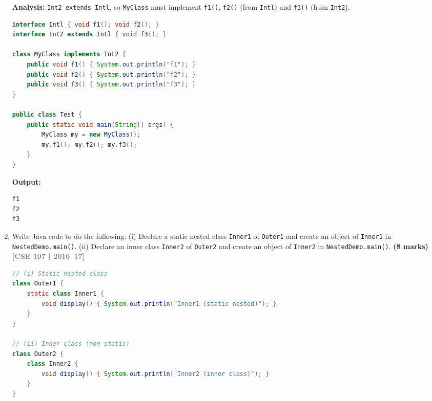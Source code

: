 \documentclass[12pt,a3paper]{article}
\newcommand{\yr}[1]{\hfill\textcolor{gray}{\small\textbf{[#1]}}}
\newcommand{\mk}[1]{\textcolor{orange!70!black}{\small\textbf{(#1 marks)}}}
\begin{document}
\begin{enumerate}
\begin{tcolorbox}[enhanced,breakable,ansbox,
  colback=cD!4,colframe=cD,boxrule=0.8pt,arc=5pt,
  title={\textbf{Answer --- Minimum Code for \texttt{MyClass}}},
  fonttitle=\bfseries\color{white},colbacktitle=cD]

\textbf{Analysis:} \texttt{Int2 extends Intl}, so \texttt{MyClass}
must implement \texttt{f1()}, \texttt{f2()} (from \texttt{Intl}) and
\texttt{f3()} (from \texttt{Int2}).

\begin{lstlisting}[language=Java]
interface Intl { void f1(); void f2(); }
interface Int2 extends Intl { void f3(); }

class MyClass implements Int2 {
    public void f1() { System.out.println("f1"); }
    public void f2() { System.out.println("f2"); }
    public void f3() { System.out.println("f3"); }
}

public class Test {
    public static void main(String[] args) {
        MyClass my = new MyClass();
        my.f1(); my.f2(); my.f3();
    }
}
\end{lstlisting}

\textbf{Output:}
\begin{lstlisting}
f1
f2
f3
\end{lstlisting}

\end{tcolorbox}

\item Write Java code to do the following: (i) Declare a static nested class \texttt{Inner1} of \texttt{Outer1} and create an object of \texttt{Inner1} in \texttt{NestedDemo.main()}. (ii) Declare an inner class \texttt{Inner2} of \texttt{Outer2} and create an object of \texttt{Inner2} in \texttt{NestedDemo.main()}. \mk{8}
\yr{CSE 107 | 2016--17}

\begin{tcolorbox}[enhanced,breakable,ansbox,
  colback=cD!4,colframe=cD,boxrule=0.8pt,arc=5pt,
  title={\textbf{Answer --- Static Nested \& Inner Class Object Creation}},
  fonttitle=\bfseries\color{white},colbacktitle=cD]

\begin{lstlisting}[language=Java]
// (i) Static nested class
class Outer1 {
    static class Inner1 {
        void display() { System.out.println("Inner1 (static nested)"); }
    }
}

// (ii) Inner class (non-static)
class Outer2 {
    class Inner2 {
        void display() { System.out.println("Inner2 (inner class)"); }
    }
}


\end{lstlisting}
\end{tcolorbox}
\end{enumerate}
\end{document}
